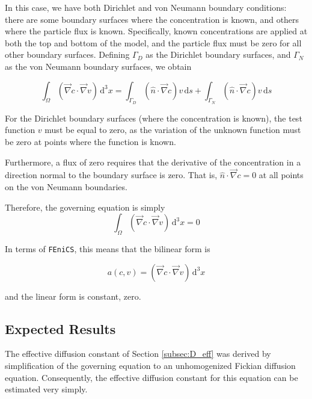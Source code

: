 In this case, we have both Dirichlet and von Neumann boundary conditions:
there are some boundary surfaces where the concentration is known,
and others where the particle flux is known.
Specifically, known concentrations are applied at both the top and bottom of the model,
and the particle flux must be zero for all other boundary surfaces.
Defining $\Gamma_D$ as the Dirichlet boundary surfaces,
and $\Gamma_N$ as the von Neumann boundary surfaces, we obtain

\begin{equation}
\int_{\Omega} \left( \vec{\nabla}c \cdot \vec{\nabla}v \right) \,\mathrm{d}^3x =
\int_{\Gamma_D} \left( \hat{n} \cdot \vec{\nabla} c \right) v\,\mathrm{d}s
+\int_{\Gamma_N} \left( \hat{n} \cdot \vec{\nabla} c \right) v\,\mathrm{d}s
\end{equation}

For the Dirichlet boundary surfaces (where the concentration is known),
the test function $v$ must be equal to zero,
as the variation of the unknown function must be zero at points where the function is known.

Furthermore, a flux of zero requires that the derivative of the concentration in a direction
normal to the boundary surface is zero.
That is, $\hat{n} \cdot \vec{\nabla} c = 0$ at all points on the von Neumann boundaries.

Therefore, the governing equation is simply
\begin{equation}
\int_{\Omega} \left( \vec{\nabla}c \cdot \vec{\nabla}v \right) \,\mathrm{d}^3x = 0
\end{equation}

In terms of \texttt{FEniCS}, this means that the bilinear form is

\begin{equation}
a(c,v)=\left( \vec{\nabla}c \cdot \vec{\nabla}v \right) \,\mathrm{d}^3x
\end{equation}

and the linear form is constant, zero.

\subsection{Expected Results}\label{subsec:unhom_fick_expected}

The effective diffusion constant of Section \ref{subsec:D_eff}
was derived by simplification of the governing equation
to an unhomogenized Fickian diffusion equation.
Consequently, the effective diffusion constant for this equation
can be estimated very simply.

